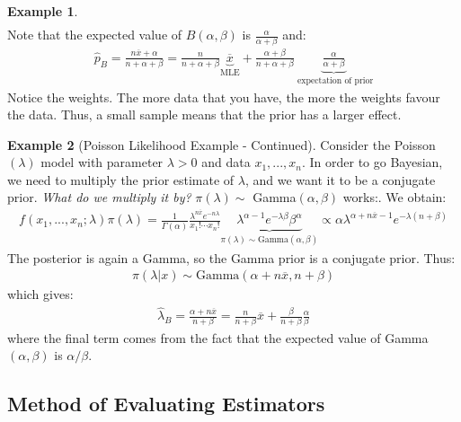 \documentclass[11pt]{scrartcl}
\theoremstyle{definition}
\newtheorem{ex}{Example}
\theoremstyle{remark}
\begin{document}
{\begin{ex}
\begin{align*}
	\end{align*}
	Note that the expected value of $B(\alpha, \beta)$ is $\frac{\alpha}{\alpha + \beta}$ and: 
	\begin{align*}
		\hat{p}_B  = \frac{n\overline{x} + \alpha}{n + \alpha + \beta} = \frac{n}{n + \alpha + \beta} \underbrace{\overline{x}}_{\text{MLE}} + \frac{\alpha + \beta}{n + \alpha + \beta} \underbrace{\frac{\alpha}{\alpha + \beta}}_{\text{ expectation of prior}}	
	\end{align*}
	Notice the weights. The more data that you have, the more the weights favour the data. Thus, a small sample means that the prior has a larger effect. 
\end{ex}

\begin{ex}[Poisson Likelihood Example - Continued]
	Consider the Poisson$(\lambda)$ model with parameter $\lambda > 0$ and data $x_1, ..., x_n$. In order to go Bayesian, we need to multiply the prior estimate of $\lambda$, and we want it to be a conjugate prior. \emph{What do we multiply it by?} $\pi(\lambda) \sim$ Gamma$(\alpha, \beta)$ works:. We obtain: 
	\begin{align}
		f(x_1, ..., x_n; \lambda) \pi(\lambda) = 
		\frac{1}{\Gamma(\alpha)} \frac{\lambda^{n \overline{x}} e^{-n \lambda}}{x_1! \cdots x_n!} \underbrace{\lambda^{\alpha-1} e^{-\lambda \beta} \beta^\alpha}_{\pi(\lambda) \sim \text{Gamma}(\alpha, \beta)} \propto \alpha \lambda^{\alpha + n \overline{x} - 1} e^{-\lambda (n + \beta)}
	\end{align}
	The posterior is again a Gamma, so the Gamma prior is a conjugate prior. Thus: 
	\begin{align*}
		\pi(\lambda | x ) \sim \text{Gamma}(\alpha + n \overline{x}, n + \beta) 	
	\end{align*}
	which gives: 
	\begin{align*}
		\hat{\lambda}_B = \frac{\alpha + n \overline{x}}{n + \beta} = \frac{n}{n+\beta} \overline{x} + \frac{\beta}{n+ \beta} \frac{\alpha}{\beta}	
	\end{align*}
	where the final term comes from the fact that the expected value of Gamma$(\alpha, \beta)$ is $\alpha / \beta$. 

\end{ex}


\subsection{Method of Evaluating Estimators}

}
\end{document}
